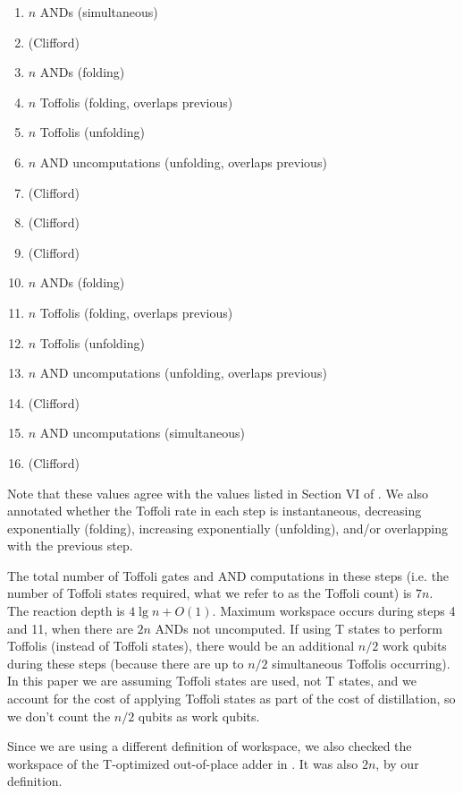 \documentclass[onecolumn,unpublished]{quantumarticle}
\theoremstyle{definition}
\theoremstyle{definition}
\theoremstyle{definition}
\begin{document}
\begin{enumerate}
    \item $n$ ANDs (simultaneous)
    \item (Clifford)
    \item $n$ ANDs (folding)
    \item $n$ Toffolis (folding, overlaps previous)
    \item $n$ Toffolis (unfolding)
    \item $n$ AND uncomputations (unfolding, overlaps previous)
    \item (Clifford)
    \item (Clifford)
    \item (Clifford)
    \item $n$ ANDs (folding)
    \item $n$ Toffolis (folding, overlaps previous)
    \item $n$ Toffolis (unfolding)
    \item $n$ AND uncomputations (unfolding, overlaps previous)
    \item (Clifford)
    \item $n$ AND uncomputations (simultaneous)
    \item (Clifford)
\end{enumerate}

Note that these values agree with the values listed in Section VI of \cite{thapliyal2020lookahead}.
We also annotated whether the Toffoli rate in each step is instantaneous, decreasing exponentially (folding), increasing exponentially (unfolding), and/or overlapping with the previous step.

The total number of Toffoli gates and AND computations in these steps (i.e. the number of Toffoli states required, what we refer to as the Toffoli count) is $7n$.
The reaction depth is $4 \lg n + O(1)$.
Maximum workspace occurs during steps 4 and 11, when there are $2n$ ANDs not uncomputed.
If using T states to perform Toffolis (instead of Toffoli states), there would be an additional $n/2$ work qubits during these steps (because there are up to $n/2$ simultaneous Toffolis occurring).
In this paper we are assuming Toffoli states are used, not T states, and we account for the cost of applying Toffoli states as part of the cost of distillation, so we don't count the $n/2$ qubits as work qubits.

Since we are using a different definition of workspace, we also checked the workspace of the T-optimized out-of-place adder in \cite{thapliyal2020lookahead}.
It was also $2n$, by our definition.
\end{document}
